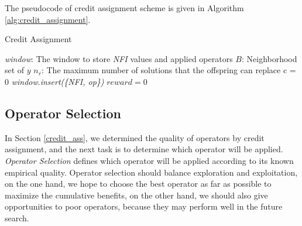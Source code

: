 \documentclass[journal]{IEEEtran}
\begin{document}
The pseudocode of credit assignment scheme is given in Algorithm \ref{alg:credit_assignment}.
\begin{algorithm}[t]
    \label{alg:credit_assignment}
    \caption{Credit Assignment}
    \small
    \textit{window}: The window to store \textit{NFI} values and applied operators\;  %
    $B$: Neighborhood set of $y$\;
    $n_r$: The maximum number of solutions that the offspring can replace\;
    c = 0\;  %
    \textit{window}.\textit{insert(\{NFI, op\})}\;
    $\textit{reward} = 0$\;
    \;
\end{algorithm}

\subsection{Operator Selection \label{operator_selection}}
In Section \ref{credit_ass}, we determined the quality of operators by credit assignment, and the next task is to determine which operator will be applied. \textit{Operator Selection} defines which operator will be applied according to its known empirical quality.
Operator selection should balance exploration and exploitation, on the one hand, we hope to choose the best operator as far as possible to maximize the cumulative benefits, on the other hand, we should also give opportunities to poor operators, because they may perform well in the future search.
\end{document}

